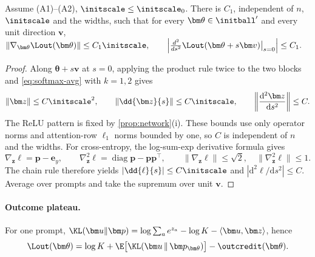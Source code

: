 \begin{lemma}
\label{lem:end-smooth}
Assume (A1)--(A2), $\initscale\le\initscale_0$. There is $C_1$, independent of $n$, $\initscale$ and the widths, such that for every $\bm\theta\in\initball'$ and
every unit direction $\bm v$,
 $\|\nabla_{\bm\theta}\Lout(\bm\theta)\|\le C_1\initscale,\qquad \Bigl|\frac{d^2}{ds^2}\Lout(\bm\theta+s\bm v)\big|_{s=0}\Bigr|\le C_1 .$ 
\end{lemma}

\begin{proof}
Along $\bm\theta+s\bm v$ at $s=0$, applying the product rule twice to the
two blocks and \cref{eq:softmax-avg} with $k=1,2$ gives
\[
 \|\bm z\|\le C\initscale^2,\qquad
 \left\|\dd{\bm z}{s}\right\|\le C\initscale,\qquad
 \left\|\frac{\mathrm d^2\bm z}{\mathrm d s^2}\right\|\le C.
\]
The ReLU pattern is fixed by \cref{prop:network}(i). These bounds use only
operator norms and attention-row $\ell_1$ norms bounded by one, so $C$ is
independent of $n$ and the widths.
For cross-entropy, the log-sum-exp derivative formula
\citep[Section~3.1.5]{boyd2004convex} gives
\[
 \nabla_{\bm z}\ell=\bm p-\bm e_y,\qquad
 \nabla_{\bm z}^2\ell=\operatorname{diag}\bm p-\bm p\bm p^\top,
 \qquad \|\nabla_{\bm z}\ell\|\le\sqrt2,\quad
 \|\nabla_{\bm z}^2\ell\|\le1.
\]
The chain rule therefore yields
$|\dd{\ell}{s}|\le C\initscale$ and
$|\mathrm d^2\ell/\mathrm d s^2|\le C$.
Average over prompts and take the supremum over unit $\bm v$.
\end{proof}

\paragraph{Outcome plateau.}\label{app:end} For one prompt, $\KL(\bm u\|\bm p)=\log\sum_ae^{z_a}-\log K-\langle\bm u,\bm z\rangle$, hence
\begin{equation}
 \Lout(\bm\theta)=\log K+\E\bigl[\KL(\bm u\,\|\,\bm p_{\bm\theta})\bigr]-\outcredit(\bm\theta).
 \label{eq:lo-identity}
\end{equation}

